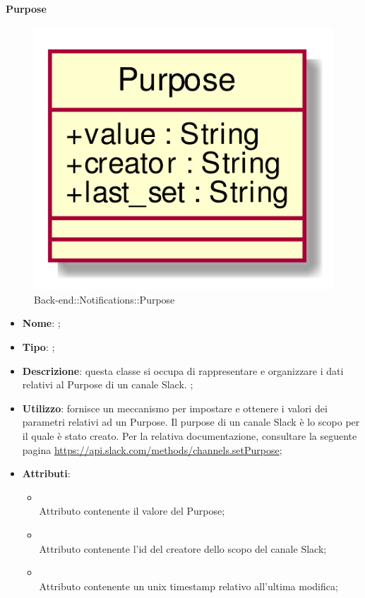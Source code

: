 \hypertarget{Purpose_label}{\paragraph{Purpose}}
\begin{figure}[h]
	\centering
	\includegraphics[width=\textwidth,height=\textheight,keepaspectratio]{images/ClassPurpose.png}
	\caption{Back-end::Notifications::Purpose}
\end{figure}
\begin{itemize}
	\item \textbf{Nome}: ;
	\item \textbf{Tipo}: ;
	\item \textbf{Descrizione}: questa classe si occupa di rappresentare e organizzare i dati relativi al Purpose di un canale Slack.
;
	\item \textbf{Utilizzo}: fornisce un meccanismo per impostare e ottenere i valori dei parametri relativi ad un Purpose.
Il purpose di un canale Slack è lo scopo per il quale è stato creato.
Per la relativa documentazione, consultare la seguente pagina \url{https://api.slack.com/methods/channels.setPurpose};
	\item \textbf{Attributi}:
	\begin{itemize}
		\item[]  \\
		Attributo contenente il valore del Purpose;
		\item[]  \\
		Attributo contenente l'id del creatore dello scopo del canale Slack;
		\item[]  \\
		Attributo contenente un unix timestamp relativo all'ultima modifica;
	\end{itemize}
\end{itemize}
\FloatBarrier

